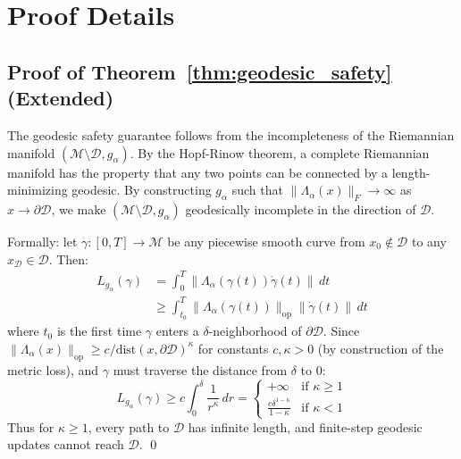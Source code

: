 \documentclass{article}
\begin{document}



\newpage
\appendix
\section{Proof Details}
\label{app:proofs}

\subsection{Proof of Theorem~\ref{thm:geodesic_safety} (Extended)}

The geodesic safety guarantee follows from the incompleteness of the Riemannian manifold $(\mathcal{M} \setminus \mathcal{D}, g_\alpha)$. By the Hopf-Rinow theorem, a complete Riemannian manifold has the property that any two points can be connected by a length-minimizing geodesic. By constructing $g_\alpha$ such that $\|\Lambda_\alpha(x)\|_F \to \infty$ as $x \to \partial\mathcal{D}$, we make $(\mathcal{M} \setminus \mathcal{D}, g_\alpha)$ geodesically incomplete in the direction of $\mathcal{D}$.

Formally: let $\gamma: [0, T] \to \mathcal{M}$ be any piecewise smooth curve from $x_0 \notin \mathcal{D}$ to any $x_\mathcal{D} \in \mathcal{D}$. Then:
\begin{align}
    L_{g_\alpha}(\gamma) &= \int_0^T \|\Lambda_\alpha(\gamma(t)) \dot{\gamma}(t)\| \, dt \\
    &\geq \int_{t_0}^T \|\Lambda_\alpha(\gamma(t))\|_\text{op} \|\dot{\gamma}(t)\| \, dt
\end{align}
where $t_0$ is the first time $\gamma$ enters a $\delta$-neighborhood of $\partial\mathcal{D}$. Since $\|\Lambda_\alpha(x)\|_\text{op} \geq c / \text{dist}(x, \partial\mathcal{D})^\kappa$ for constants $c, \kappa > 0$ (by construction of the metric loss), and $\gamma$ must traverse the distance from $\delta$ to $0$:
\begin{equation}
    L_{g_\alpha}(\gamma) \geq c \int_0^\delta \frac{1}{r^\kappa} \, dr = \begin{cases} +\infty & \text{if } \kappa \geq 1 \\ \frac{c \delta^{1-\kappa}}{1-\kappa} & \text{if } \kappa < 1 \end{cases}
\end{equation}
Thus for $\kappa \geq 1$, every path to $\mathcal{D}$ has infinite length, and finite-step geodesic updates cannot reach $\mathcal{D}$. \qed
\end{document}

